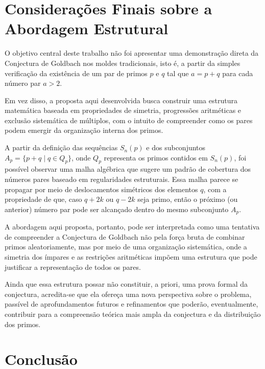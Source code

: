 \documentclass[a4paper,11pt]{article}
\theoremstyle{definition}
\theoremstyle{remark}
\begin{document}
\begin{otherlanguage}{brazil}
	
	\section{Considerações Finais sobre a Abordagem Estrutural}
	
	O objetivo central deste trabalho não foi apresentar uma demonstração direta da Conjectura de Goldbach nos moldes tradicionais, isto é, a partir da simples verificação da existência de um par de primos \(p\) e \(q\) tal que \(a = p + q\) para cada número par \(a > 2\).
	
	Em vez disso, a proposta aqui desenvolvida busca construir uma estrutura matemática baseada em propriedades de simetria, progressões aritméticas e exclusão sistemática de múltiplos, com o intuito de compreender como os pares podem emergir da organização interna dos primos.
	
	A partir da definição das sequências \(S_n(p)\) e dos subconjuntos \(A_p = \{p + q \mid q \in Q_p\}\), onde \(Q_p\) representa os primos contidos em \(S_n(p)\), foi possível observar uma malha algébrica que sugere um padrão de cobertura dos números pares baseado em regularidades estruturais. Essa malha parece se propagar por meio de deslocamentos simétricos dos elementos \(q\), com a propriedade de que, caso \(q + 2k\) ou \(q - 2k\) seja primo, então o próximo (ou anterior) número par pode ser alcançado dentro do mesmo subconjunto \(A_p\).
	
	A abordagem aqui proposta, portanto, pode ser interpretada como uma tentativa de compreender a Conjectura de Goldbach não pela força bruta de combinar primos aleatoriamente, mas por meio de uma organização sistemática, onde a simetria dos ímpares e as restrições aritméticas impõem uma estrutura que pode justificar a representação de todos os pares.
	
	Ainda que essa estrutura possar não constituir, a priori, uma prova formal da conjectura, acredita-se que ela ofereça uma nova perspectiva sobre o problema, passível de aprofundamentos futuros e refinamentos que poderão, eventualmente, contribuir para a compreensão teórica mais ampla da conjectura e da distribuição dos primos.
	
	
	\section{Conclusão}
	

\end{otherlanguage}
\end{document}
